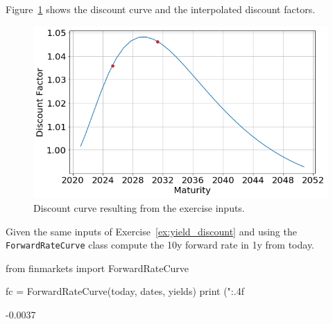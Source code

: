 \begin{solution}
Figure~\ref{fig:ex_discount} shows the discount curve and the interpolated discount factors.

\begin{figure}[htpb]
\centering
\includegraphics[width=0.7\linewidth]{figures/ex_discount}
\caption{Discount curve resulting from the exercise inputs.}
\label{fig:ex_discount}
\end{figure}
\end{solution}

%
%


\begin{question}
Given the same inputs of Exercise~\ref{ex:yield_discount} and using the \texttt{ForwardRateCurve} class compute the 10y forward rate in 1y from today. 
\end{question}

\cprotEnv\begin{solution}
\begin{ipython}
from finmarkets import ForwardRateCurve

fc = ForwardRateCurve(today, dates, yields)
print ("{:.4f}%
\end{ipython}
\begin{ioutput}
-0.0037%
\end{ioutput}
\end{solution}

